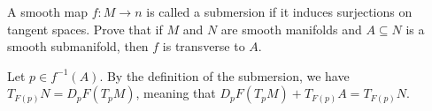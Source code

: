\documentclass[10pt]{mypackage}
\begin{document}
\RaggedRight
\begin{problem}[Problem 5]
  A smooth map $f\colon M\rightarrow n$ is called a submersion if it induces surjections on tangent spaces. Prove that if $M$ and $N$ are smooth manifolds and $A\subseteq N$ is a smooth submanifold, then $f$ is transverse to $A$.
\end{problem}
\begin{solution}
  Let $p\in f^{-1}\left( A \right)$. By the definition of the submersion, we have $T_{F(p)}N = D_pF\left( T_pM \right)$, meaning that $D_pF\left( T_pM \right) + T_{F(p)}A = T_{F(p)}N$.
\end{solution}
\end{document}
